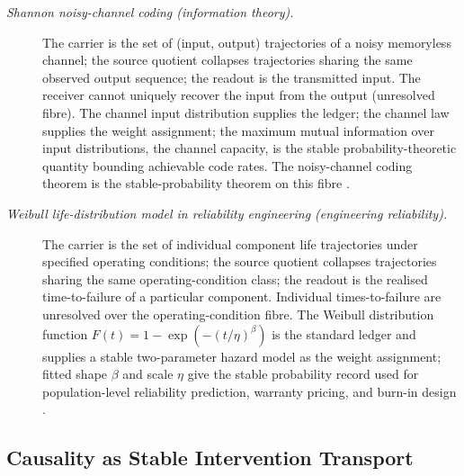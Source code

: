 \documentclass[11pt]{article}
\theoremstyle{definition}
\begin{document}
\begin{description}
\item[\emph{Shannon noisy-channel coding (information
theory).}]
The carrier is the set of (input, output) trajectories
of a noisy memoryless channel; the source quotient
collapses trajectories sharing the same observed output
sequence; the readout is the transmitted input.  The
receiver cannot uniquely recover the input from the
output (unresolved fibre).  The channel input
distribution supplies the ledger; the channel law
supplies the weight assignment; the maximum mutual
information over input distributions, the channel
capacity, is the stable probability-theoretic quantity
bounding achievable code rates.  The noisy-channel
coding theorem is the stable-probability theorem on
this fibre \citep{Shannon1948Mathematical}.

\item[\emph{Weibull life-distribution model in
reliability engineering (engineering reliability).}]
The carrier is the set of individual component
life trajectories under specified operating conditions;
the source quotient collapses trajectories sharing the
same operating-condition class; the readout is the
realised time-to-failure of a particular component.
Individual times-to-failure are unresolved over the
operating-condition fibre.  The Weibull distribution
function \(F(t)=1-\exp(-(t/\eta)^{\beta})\) is the
standard ledger and supplies a stable two-parameter
hazard model as the weight assignment; fitted shape
\(\beta\) and scale \(\eta\) give the stable
probability record used for population-level
reliability prediction, warranty pricing, and burn-in
design \citep{Weibull1951Statistical}.
\end{description}

\subsection{Causality as Stable Intervention Transport}\label{sec:status-records-coherence:causality}
\end{document}

